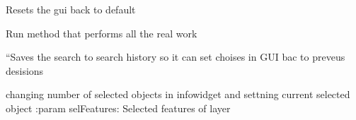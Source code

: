 \documentclass[letterpaper,10pt,english]{sphinxmanual}
\begin{document}
\begin{fulllineitems}
\begin{fulllineitems}
\label{\detokenize{code:Tilgjengelighet.Tilgjengelighet.reset}}
Resets the gui back to default

\end{fulllineitems}


\begin{fulllineitems}
\label{\detokenize{code:Tilgjengelighet.Tilgjengelighet.resolve}}
\end{fulllineitems}


\begin{fulllineitems}
\label{\detokenize{code:Tilgjengelighet.Tilgjengelighet.run}}
Run method that performs all the real work

\end{fulllineitems}


\begin{fulllineitems}
\label{\detokenize{code:Tilgjengelighet.Tilgjengelighet.savePath}}
\end{fulllineitems}


\begin{fulllineitems}
\label{\detokenize{code:Tilgjengelighet.Tilgjengelighet.save_search}}
“Saves the search to search history so it can set choises in GUI bac to preveus desisions

\end{fulllineitems}


\begin{fulllineitems}
\label{\detokenize{code:Tilgjengelighet.Tilgjengelighet.selectedObjects}}
changing number of selected objects in infowidget and settning current selected object
:param selFeatures: Selected features of layer


\end{fulllineitems}
\end{fulllineitems}
\end{document}
